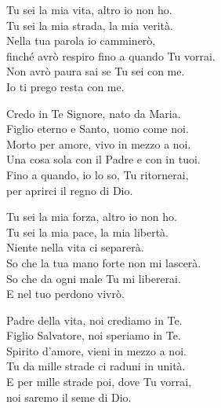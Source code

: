 
\strofa Tu sei la mia vita, altro io non ho.\\
Tu sei la mia strada, la mia verità.\\
Nella tua parola io camminerò,\\
finché avrò respiro fino a quando Tu vorrai.\\
Non avrò paura sai se Tu sei con me.\\
Io ti prego resta con me.

\spazio

\strofa Credo in Te Signore, nato da Maria.\\
Figlio eterno e Santo, uomo come noi.\\
Morto per amore, vivo in mezzo a noi.\\
Una cosa sola con il Padre e con in tuoi.\\
Fino a quando, io lo so, Tu ritornerai,\\
per aprirci il regno di Dio.

\spazio

\strofa Tu sei la mia forza, altro io non ho.\\
Tu sei la mia pace, la mia libertà.\\
Niente nella vita ci separerà.\\
So che la tua mano forte non mi lascerà.\\
So che da ogni male Tu mi libererai.\\
E nel tuo perdono vivrò.

\spazio

\strofa Padre della vita, noi crediamo in Te.\\
Figlio Salvatore, noi speriamo in Te.\\
Spirito d'amore, vieni in mezzo a noi.\\
Tu da mille strade ci raduni in unità.\\
E per mille strade poi, dove Tu vorrai,\\
noi saremo il seme di Dio.